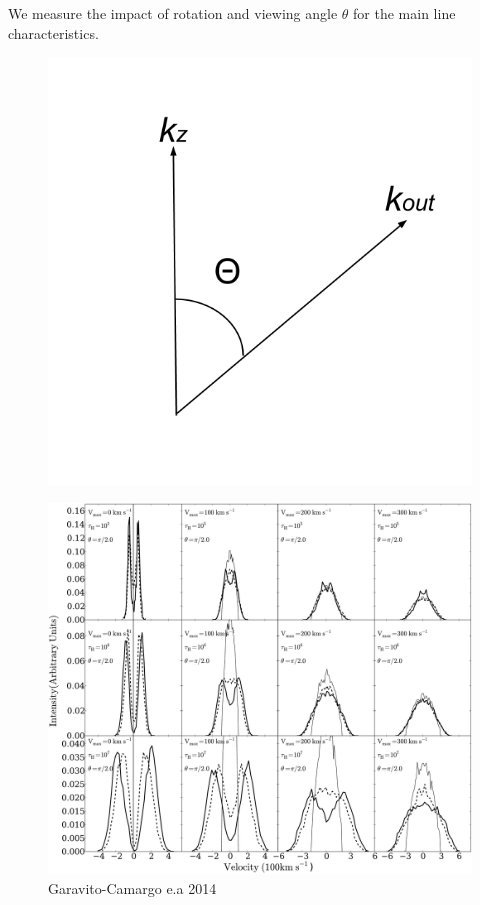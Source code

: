\documentclass{beamer}
\begin{document}
\begin{frame}
\LARGE{We measure the impact of rotation and viewing angle $\theta$ for the 
main line characteristics.}
\begin{figure}
\includegraphics[scale=0.2]{Figures/theta.png}
\end{figure}
\end{frame}

\begin{frame}
\begin{figure}
\includegraphics[scale=0.2]{Figures/f4.pdf}
\caption*{Garavito-Camargo e.a 2014}
\end{figure}
\end{frame}
\end{document}
